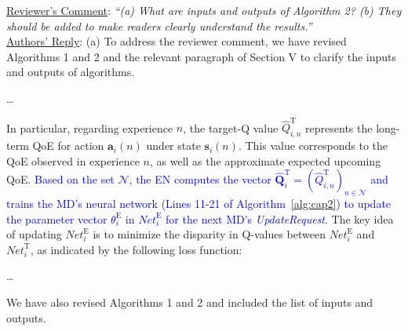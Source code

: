 \documentclass[12pt,draftclsnofoot,onecolumn]{IEEEtran}
\newcommand{\rev}[1]{{\color{blue}#1}} %
\newcommand{\rev}[1]{#1}
\newenvironment{my}[2]%
{\begin{list}{}%
{\setlength{\rightmargin}{#1}\setlength{\leftmargin}{#2}}%


 \item[]{}

} {\end{list}}
\begin{document}
\begin{enumerate}
\begin{my}{1cm}{1cm}
\end{my}\vspace{6mm}
	


	\item \underline{Reviewer's Comment}: 
	\textit{``(a) What are inputs and outputs of Algorithm 2? (b) They should be added to make readers clearly understand the results.''} \\\newline
	\underline{Authors' Reply}: (a) To address the reviewer comment, we have revised Algorithms 1 and 2 and the relevant paragraph of Section V to clarify the inputs and outputs of algorithms.\newline
	
	\begin{my}{1cm}{1cm} 
		\rev{
		
		\dots \color{black}
		
		
		In particular, regarding experience $n$, the target-Q value $\hat{Q}_{i,n}^{\text{T}}$ represents the long-term QoE for action $\boldsymbol{a}_i(n)$ under state $\boldsymbol{s}_i(n)$. This value corresponds to the QoE observed in experience $n$, as well as the approximate expected upcoming QoE. 
			\textcolor{blue}{Based on the set $\mathcal{N}$, the EN computes the vector $\hat{\mathbf{Q}}_i^{\text{T}} = (\hat{Q}^{\text{T}}_{i,n})_{n \in \mathcal{N}}$ and trains the MD's neural network (Lines 11-21 of Algorithm~\ref{alg:cap2}) to update the parameter vector $\theta^{\text{E}}_i$ in $\textit{Net}_i^{\text{E}}$ for the next MD's \textit{UpdateRequest}.} The key idea of updating $\textit{Net}_i^{\text{E}}$ is to minimize the disparity in Q-values between $\textit{Net}_i^{\text{E}}$ and $\textit{Net}_i^{\text{T}}$, as indicated by the following loss function:
			
			
			\dots}
	\end{my}
		
	We have also revised Algorithms 1 and 2 and included the list of inputs and outputs.\\	
	


\end{enumerate}
\end{document}

